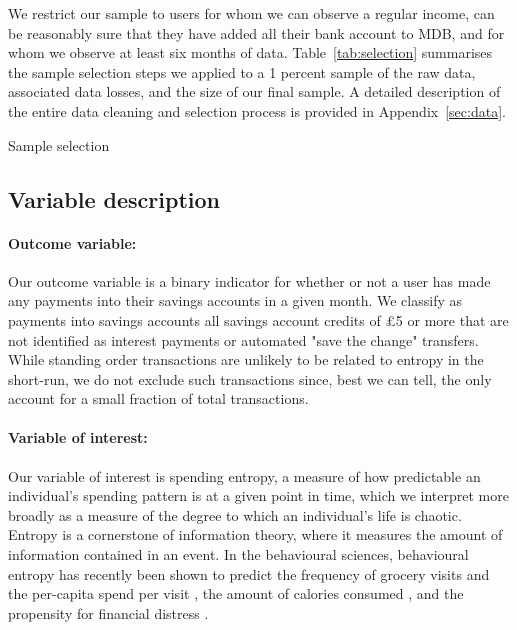 We restrict our sample to users for whom we can observe a regular income, can
be reasonably sure that they have added all their bank account to MDB, and for
whom we observe at least six months of data. Table~\ref{tab:selection}
summarises the sample selection steps we applied to a 1 percent sample of the
raw data, associated data losses, and the size of our final sample. A detailed
description of the entire data cleaning and selection process is provided in
Appendix~\ref{sec:data}.

\begin{table}[H]
\caption{Sample selection}\label{tab:selection}

\end{table}

\subsection{Variable description}%
\label{sub:dependent_variable}

\paragraph{Outcome variable:}%
\label{par:outcome_variable_}
Our outcome variable is a binary indicator for whether or not a user has made
any payments into their savings accounts in a given month. We classify as
payments into savings accounts all savings account credits of \pounds5 or more
that are not identified as interest payments or automated "save the change"
transfers. While standing order transactions are unlikely to be related to
entropy in the short-run, we do not exclude such transactions since, best we
can tell, the only account for a small fraction of total transactions.

\paragraph{Variable of interest:}%
\label{par:variable_of_interest_}
Our variable of interest is spending entropy, a measure of how predictable an
individual's spending pattern is at a given point in time, which we interpret
more broadly as a measure of the degree to which an individual's life is
chaotic. Entropy is a cornerstone of information theory, where it measures the
amount of information contained in an event. In the behavioural sciences,
behavioural entropy has recently been shown to predict the frequency of grocery
visits and the per-capita spend per visit \citep{guidotti2015behavioral}, the
amount of calories consumed \citep{skatova2019those}, and the propensity for
financial distress \citep{muggleton2020evidence}.

